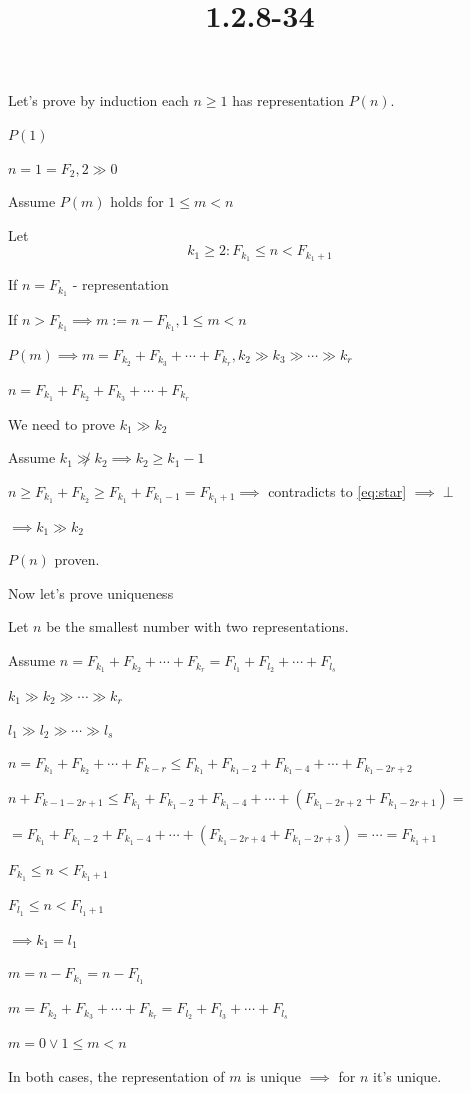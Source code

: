 \documentclass{article}
\title{1.2.8-34}
\begin{document}
\maketitle

Let's prove by induction each \( n \geq 1 \) has representation \( P(n) \).

\( P(1) \)

\( n = 1 = F_2, 2 \gg 0 \)

Assume \( P(m) \) holds for \( 1 \leq m < n \)

Let
\[k_1 \geq 2: F_{k_1} \leq n < F_{k_1+1} \tag{*}\label{eq:star}\]

If \( n = F_{k_1} \) - representation

If \( n > F_{k_1} \implies m := n - F_{k_1}, 1 \leq m < n \)

\( P(m) \implies m = F_{k_2} + F_{k_3} + \cdots + F_{k_r}, k_2 \gg k_3 \gg \cdots \gg k_r \)

\( n = F_{k_1} + F_{k_2} + F_{k_3} + \cdots + F_{k_r} \)

We need to prove \( k_1 \gg k_2 \)

Assume \( k_1 \not\gg k_2 \implies k_2 \geq k_1 - 1 \)

\( n \geq F_{k_1} + F_{k_2} \geq F_{k_1} + F_{k_1-1} = F_{k_1 + 1} \implies \) contradicts to \eqref{eq:star} \( \implies \perp \)

\( \implies k_1 \gg k_2 \)

\( P(n) \) proven.

Now let's prove uniqueness

Let \( n \) be the smallest number with two representations.

Assume \( n = F_{k_1} + F_{k_2} + \cdots + F_{k_r} = F_{l_1} + F_{l_2} + \cdots + F_{l_s} \)

\( k_1 \gg k_2 \gg \cdots \gg k_r \)

\( l_1 \gg l_2 \gg \cdots \gg l_s \)

\( n = F_{k_1} + F_{k_2} + \cdots + F_{k-r} \leq F_{k_1} + F_{k_1 - 2} + F_{k_1 - 4} + \cdots + F_{k_1 - 2r + 2} \)

\( n + F_{k-1-2r+1} \leq F_{k_1} + F_{k_1 - 2} + F_{k_1 - 4} + \cdots + (F_{k_1 - 2r + 2} + F_{k_1 - 2r + 1}) = \)

\( = F_{k_1} + F_{k_1 - 2} + F_{k_1 - 4} + \cdots + (F_{k_1 - 2r + 4} + F_{k_1 - 2r + 3}) = \cdots = F_{k_1 + 1} \)

\( F_{k_1} \leq n < F_{k_1 + 1} \)

\( F_{l_1} \leq n < F_{l_1 + 1} \)

\( \implies k_1 = l_1 \)

\( m = n - F_{k_1} = n - F_{l_1} \)

\( m = F_{k_2} + F_{k_3} + \cdots + F_{k_r} = F_{l_2} + F_{l_3} + \cdots + F_{l_s} \)

\( m = 0 \lor 1 \leq m < n \)

In both cases, the representation of \( m \) is unique \( \implies \) for \( n \) it's unique.
\end{document}
